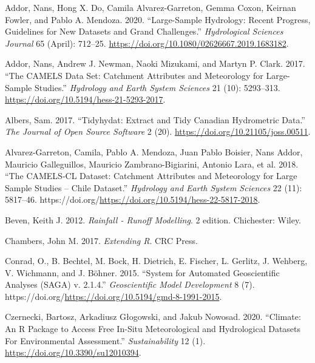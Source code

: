 \hypertarget{refs}{}
\begin{CSLReferences}{1}{0}
\leavevmode{}%
Addor, Nans, Hong X. Do, Camila Alvarez-Garreton, Gemma Coxon, Keirnan Fowler, and Pablo A. Mendoza. 2020. {``Large-Sample Hydrology: Recent Progress, Guidelines for New Datasets and Grand Challenges.''} \emph{Hydrological Sciences Journal} 65 (April): 712--25. \url{https://doi.org/10.1080/02626667.2019.1683182}.

\leavevmode{}%
Addor, Nans, Andrew J. Newman, Naoki Mizukami, and Martyn P. Clark. 2017. {``The {CAMELS} Data Set: Catchment Attributes and Meteorology for Large-Sample Studies.''} \emph{Hydrology and Earth System Sciences} 21 (10): 5293--313. \url{https://doi.org/10.5194/hess-21-5293-2017}.

\leavevmode{}%
Albers, Sam. 2017. {``Tidyhydat: Extract and Tidy Canadian Hydrometric Data.''} \emph{The Journal of Open Source Software} 2 (20). \url{https://doi.org/10.21105/joss.00511}.

\leavevmode{}%
Alvarez-Garreton, Camila, Pablo A. Mendoza, Juan Pablo Boisier, Nans Addor, Mauricio Galleguillos, Mauricio Zambrano-Bigiarini, Antonio Lara, et al. 2018. {``The {CAMELS}-{CL} Dataset: Catchment Attributes and Meteorology for Large Sample Studies -- {Chile} Dataset.''} \emph{Hydrology and Earth System Sciences} 22 (11): 5817--46. https://doi.org/\url{https://doi.org/10.5194/hess-22-5817-2018}.

\leavevmode{}%
Beven, Keith J. 2012. \emph{Rainfall - {Runoff} {Modelling}}. 2 edition. Chichester: Wiley.

\leavevmode{}%
Chambers, John M. 2017. \emph{Extending {R}}. CRC Press.

\leavevmode{}%
Conrad, O., B. Bechtel, M. Bock, H. Dietrich, E. Fischer, L. Gerlitz, J. Wehberg, V. Wichmann, and J. Böhner. 2015. {``System for {Automated} {Geoscientific} {Analyses} ({SAGA}) v. 2.1.4.''} \emph{Geoscientific Model Development} 8 (7). https://doi.org/\url{https://doi.org/10.5194/gmd-8-1991-2015}.

\leavevmode{}%
Czernecki, Bartosz, Arkadiusz Głogowski, and Jakub Nowosad. 2020. {``Climate: {An} {R} {Package} to {Access} {Free} {In}-{Situ} {Meteorological} and {Hydrological} {Datasets} {For} {Environmental} {Assessment}.''} \emph{Sustainability} 12 (1). \url{https://doi.org/10.3390/su12010394}.


\end{CSLReferences}
